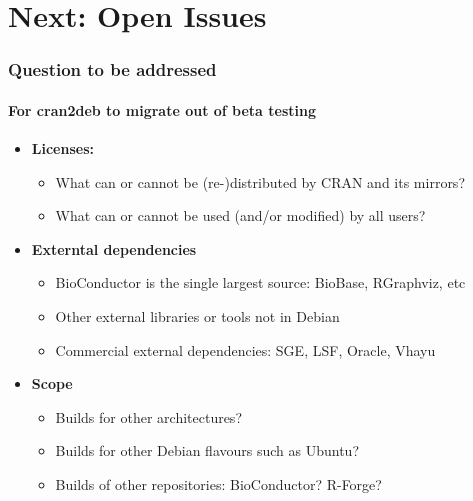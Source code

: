 \documentclass[smaller,compress]{beamer}
\begin{document}
\section[Next]{Next: Open Issues}
\begin{frame}
  \frametitle{Question to be addressed}
  \framesubtitle{For cran2deb to migrate out of beta testing}

  \begin{itemize}
  \item \textbf{Licenses:}
    \begin{itemize}
    \item  What can or cannot be (re-)distributed by CRAN and its mirrors?
    \item What can or cannot be used (and/or modified) by all users?
    \end{itemize}
  \item \textbf{Externtal dependencies} %
    \begin{itemize}
    \item BioConductor is the single largest source: BioBase, RGraphviz, etc
    \item Other external libraries or tools not in Debian 
    \item Commercial external dependencies: SGE, LSF, Oracle, Vhayu
    \end{itemize}
  \item \textbf{Scope} 
    \begin{itemize}
    \item Builds for other architectures?
    \item Builds for other Debian flavours such as Ubuntu?
    \item Builds of other repositories: BioConductor? R-Forge?
    \end{itemize}
  \end{itemize}
\end{frame}
\end{document}
